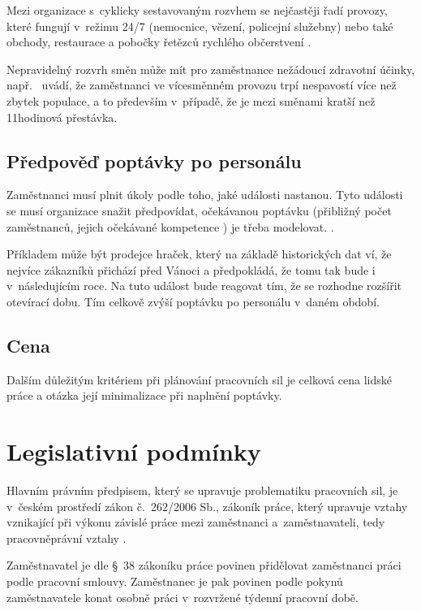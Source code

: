 \documentclass[twoside]{ctuthesis}
\begin{document}
Mezi organizace s~cyklicky sestavovaným rozvhem se nejčastěji řadí provozy, které fungují v~režimu 24/7 (nemocnice, vězení, policejní služebny) nebo také obchody, restaurace a pobočky řetězců rychlého občerstvení \cite{bechtold1981work}.

Nepravidelný rozvrh směn může mít pro zaměstnance nežádoucí zdravotní účinky, např.~\cite{flo2013shift} uvádí, že zaměstnanci ve vícesměnném provozu trpí nespavostí více než zbytek populace, a to především v~případě, že je mezi směnami kratší než 11hodinová přestávka.

\subsection{Předpověď poptávky po personálu}
\label{sub:demand}
Zaměstnanci musí plnit úkoly podle toho, jaké události nastanou. Tyto události se musí organizace snažit předpovídat, očekávanou poptávku (přibližný počet zaměstnanců, jejich očekávané kompetence \cite[s.~219]{armstrong2014}) je třeba modelovat. \cite{ernst2004staff}.

Příkladem může být prodejce hraček, který na základě historických dat ví, že nejvíce zákazníků přichází před Vánoci a předpokládá, že tomu tak bude i v~následujícím roce. Na tuto událost bude reagovat tím, že se rozhodne rozšířit otevírací dobu. Tím celkově zvýší poptávku po personálu v~daném období.

\subsection{Cena}
Dalším důležitým kritériem při plánování pracovních sil je celková cena lidské práce a otázka její minimalizace při naplnění poptávky.


\section{Legislativní podmínky}
\label{section:legislativa}
Hlavním právním předpisem, který se upravuje problematiku pracovních sil, je v~českém prostředí zákon č.~262/2006 Sb., zákoník práce, který upravuje vztahy vznikající při výkonu závislé práce mezi zaměstnanci a~zaměstnavateli, tedy pracovněprávní vztahy \cite{zakonik06-262}.

Zaměstnavatel je dle §~38 zákoníku práce povinen přidělovat zaměstnanci práci podle pracovní smlouvy. Zaměstnanec je pak povinen podle pokynů zaměstnavatele konat osobně práci v~rozvržené týdenní pracovní době.
\end{document}
